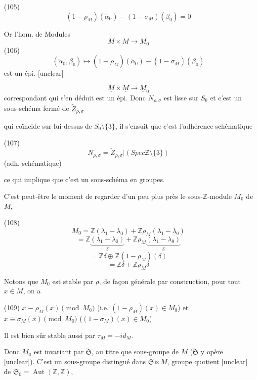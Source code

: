 (105) $$(1 - \rho_M)(\tilde{\alpha}_0) - (1 - \sigma_M)(\beta_0) = 0$$

Or l'hom. de Modules
$$M \times M \longrightarrow M_0$$
(106) $$(\tilde{\alpha}_0, \beta_0) \longmapsto (1 - \rho_{\underline{M}})(\tilde{\alpha}_0) - (1 - \sigma_{\underline{M}})(\beta_0)$$
est un épi. [unclear]

$$\underline{M} \times \underline{M} \longrightarrow \underline{M}_0$$
correspondant qui s'en déduit est un épi.
Donc $N_{\rho, \sigma}$ est lisse sur $S_0$
et c'est un sous-schéma fermé de $\tilde{Z}_{\rho, \sigma}$

\newpage


qui coïncide sur lui-dessus de $S_0 \setminus \{3\}$, il
s'ensuit que c'est l'adhérence schématique

(107) $$N_{\rho,\sigma} = \widetilde{Z}_{\rho,\sigma} | (Spec \mathbb{Z} \setminus \{3\})$$
(adh. schématique)

ce qui implique que c'est un
sous-schéma en groupes.

C'est peut-être le moment de regarder
d'un peu plus près le sous-$\mathbb{Z}$-module
$M_0$ de $M$,

(108) $$M_0 = \mathbb{Z}(\lambda_1 - \lambda_0) + \mathbb{Z} \rho_M(\lambda_1 - \lambda_0)$$
$$= \mathbb{Z} \underbrace{(\lambda_1 - \lambda_0)}_{\delta} + \mathbb{Z} \rho_M \underbrace{(\lambda_1 - \lambda_0)}_{\delta}$$
$$= \mathbb{Z} \delta \oplus \mathbb{Z} (1-\rho_M)(\delta)$$
$$= \mathbb{Z} \delta + \mathbb{Z} \rho_M \delta$$

Notons que $M_0$ est stable par $\rho$, de façon
générale par construction, pour tout $x \in M$, on a

(109) $x \equiv \rho_M(x) \pmod{M_0}$ \hspace{1cm} (i.e. $(1-\rho_M)(x) \in M_0$)
et $x \equiv \sigma_M(x) \pmod{M_0}$ \hspace{1cm} ($(1-\sigma_M)(x) \in M_0$)

Il est bien sûr stable aussi par $\tau_M = -id_M$.

Donc $M_0$ est invariant par $\widetilde{\mathfrak{S}}$,
au titre que sous-groupe de $M$ ($\widetilde{\mathfrak{S}}$ y opère [unclear]).
C'est un sous-groupe distingué dans $\widetilde{\mathfrak{S}} \ltimes M$,
groupe quotient [unclear] de $\mathfrak{S}_0 = \operatorname{Aut}(\mathbb{Z}, \mathbb{Z})$,

\newpage



